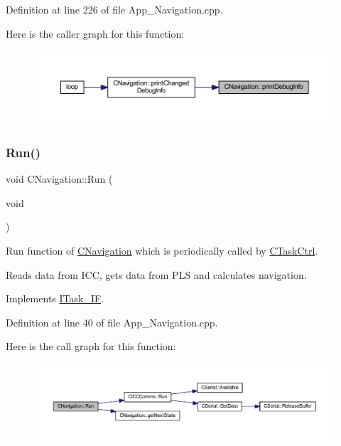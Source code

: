 Definition at line 226 of file App\+\_\+\+Navigation.\+cpp.

Here is the caller graph for this function\+:\nopagebreak
\begin{figure}[H]
\begin{center}
\leavevmode
\includegraphics[width=350pt]{class_c_navigation_a84e320cd8975593ab6f966e8794b2886_icgraph}
\end{center}
\end{figure}
\mbox{\label{class_c_navigation_a86acb1521aab400e542465c8eabed671}} 
\subsubsection{\texorpdfstring{Run()}{Run()}}
{\footnotesize\ttfamily void C\+Navigation\+::\+Run (\begin{DoxyParamCaption}\item[{void}]{ }\end{DoxyParamCaption})\hspace{0.3cm}{\ttfamily [virtual]}}



Run function of \mbox{\hyperlink{class_c_navigation}{C\+Navigation}} which is periodically called by \mbox{\hyperlink{class_c_task_ctrl}{C\+Task\+Ctrl}}. 

Reads data from I\+CC, gets data from P\+LS and calculates navigation. 

Implements \mbox{\hyperlink{class_i_task___i_f_ab73cc5879a61d00fc59b72cce32cc6f7}{I\+Task\+\_\+\+IF}}.



Definition at line 40 of file App\+\_\+\+Navigation.\+cpp.

Here is the call graph for this function\+:\nopagebreak
\begin{figure}[H]
\begin{center}
\leavevmode
\includegraphics[width=350pt]{class_c_navigation_a86acb1521aab400e542465c8eabed671_cgraph}
\end{center}
\end{figure}
\mbox{\label{class_c_navigation_a53f0409677e36f62ef232f7e15b32948}} 
